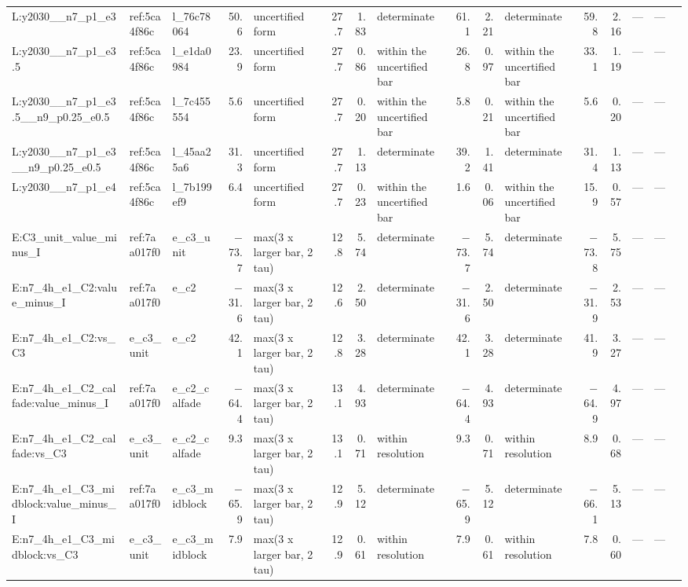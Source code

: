 \begin{table}[htbp]
\begin{tabular}{lllrlrrlrrlrrrrl}
L:y2030\_\_n7\_p1\_e3 & ref:5ca4f86c & l\_76c78064 & 50.6 & uncertified form & 27.7 & 1.83 & determinate & 61.1 & 2.21 & determinate & 59.8 & 2.16 & --- & --- &  \\
L:y2030\_\_n7\_p1\_e3.5 & ref:5ca4f86c & l\_e1da0984 & 23.9 & uncertified form & 27.7 & 0.86 & within the uncertified bar & 26.8 & 0.97 & within the uncertified bar & 33.1 & 1.19 & --- & --- &  \\
L:y2030\_\_n7\_p1\_e3.5\_\_n9\_p0.25\_e0.5 & ref:5ca4f86c & l\_7c455554 & 5.6 & uncertified form & 27.7 & 0.20 & within the uncertified bar & 5.8 & 0.21 & within the uncertified bar & 5.6 & 0.20 & --- & --- &  \\
L:y2030\_\_n7\_p1\_e3\_\_n9\_p0.25\_e0.5 & ref:5ca4f86c & l\_45aa25a6 & 31.3 & uncertified form & 27.7 & 1.13 & determinate & 39.2 & 1.41 & determinate & 31.4 & 1.13 & --- & --- &  \\
L:y2030\_\_n7\_p1\_e4 & ref:5ca4f86c & l\_7b199ef9 & 6.4 & uncertified form & 27.7 & 0.23 & within the uncertified bar & 1.6 & 0.06 & within the uncertified bar & 15.9 & 0.57 & --- & --- &  \\
E:C3\_unit\_value\_minus\_I & ref:7aa017f0 & e\_c3\_unit & $-$73.7 & max(3 x larger bar, 2 tau) & 12.8 & 5.74 & determinate & $-$73.7 & 5.74 & determinate & $-$73.8 & 5.75 & --- & --- &  \\
E:n7\_4h\_e1\_C2:value\_minus\_I & ref:7aa017f0 & e\_c2 & $-$31.6 & max(3 x larger bar, 2 tau) & 12.6 & 2.50 & determinate & $-$31.6 & 2.50 & determinate & $-$31.9 & 2.53 & --- & --- &  \\
E:n7\_4h\_e1\_C2:vs\_C3 & e\_c3\_unit & e\_c2 & 42.1 & max(3 x larger bar, 2 tau) & 12.8 & 3.28 & determinate & 42.1 & 3.28 & determinate & 41.9 & 3.27 & --- & --- &  \\
E:n7\_4h\_e1\_C2\_calfade:value\_minus\_I & ref:7aa017f0 & e\_c2\_calfade & $-$64.4 & max(3 x larger bar, 2 tau) & 13.1 & 4.93 & determinate & $-$64.4 & 4.93 & determinate & $-$64.9 & 4.97 & --- & --- &  \\
E:n7\_4h\_e1\_C2\_calfade:vs\_C3 & e\_c3\_unit & e\_c2\_calfade & 9.3 & max(3 x larger bar, 2 tau) & 13.1 & 0.71 & within resolution & 9.3 & 0.71 & within resolution & 8.9 & 0.68 & --- & --- &  \\
E:n7\_4h\_e1\_C3\_midblock:value\_minus\_I & ref:7aa017f0 & e\_c3\_midblock & $-$65.9 & max(3 x larger bar, 2 tau) & 12.9 & 5.12 & determinate & $-$65.9 & 5.12 & determinate & $-$66.1 & 5.13 & --- & --- &  \\
E:n7\_4h\_e1\_C3\_midblock:vs\_C3 & e\_c3\_unit & e\_c3\_midblock & 7.9 & max(3 x larger bar, 2 tau) & 12.9 & 0.61 & within resolution & 7.9 & 0.61 & within resolution & 7.8 & 0.60 & --- & --- &  \\

\end{tabular}
\end{table}
